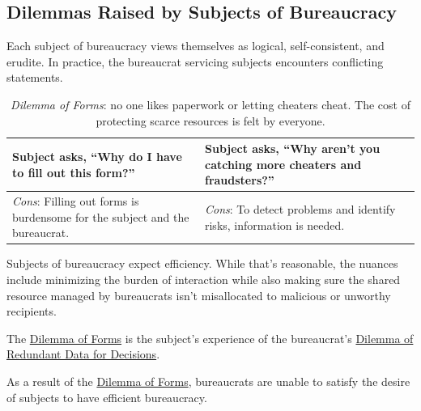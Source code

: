 \subsection*{Dilemmas Raised by Subjects of Bureaucracy\label{sec:subjects-dilemmas}}


Each subject of bureaucracy views themselves as logical, self-consistent, and erudite. In practice, the bureaucrat servicing subjects encounters conflicting statements. 

\begin{center}
\begin{table}[H] %
\begin{tabular}{ | m{\dilemmatablewidth}| m{\dilemmatablewidth} | } 
  \hline
  \textbf{Subject asks, ``Why do I have to fill out this form?''} &
  \textbf{Subject asks, ``Why aren't you catching more cheaters and fraudsters?''} \\
  \hline
  \textit{Cons}: Filling out forms is burdensome for the subject and the bureaucrat. & 
  \textit{Cons}: To detect problems and identify risks, information is needed. \\
  \hline
\end{tabular}
\caption{\textit{Dilemma of Forms}: no one likes paperwork or letting cheaters cheat. The cost of protecting scarce resources is felt by everyone.
}
\label{table:dilemma-subject-forms}
\end{table}
\end{center}

Subjects of bureaucracy expect efficiency. While that's reasonable, the nuances include minimizing the burden of interaction while also making sure the shared resource managed by bureaucrats isn't misallocated to malicious or unworthy recipients. 

The 
\hyperref[table:dilemma-subject-forms]{Dilemma of Forms}
is the subject's experience of the bureaucrat's 
\hyperref[table:dilemma-personal-single-bit-decision]{Dilemma of Redundant Data for Decisions}.

%
As a result of the \hyperref[table:dilemma-subject-forms]{Dilemma of Forms}, bureaucrats are unable to satisfy the desire of subjects to have efficient bureaucracy. 


